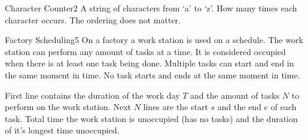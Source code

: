 \begin{task}{Character Counter}{2}
    \In
    A string of characters from `a' to `z'.
    \Out
    How many times each character occurs. The ordering does not matter.

    \begin{ExampleIO}
    \end{ExampleIO}
\end{task}

\begin{task}{Factory Scheduling}{5}
    On a factory a work station is used on a schedule. The work station
    can perform any amount of tasks at a time. It is considered occupied
    when there is at least one task being done. Multiple tasks can start
    and end in the same moment in time. No task starts and ends at the same
    moment in time.
 
    \In
    First line contains the duration of the work day $T$ and the amount of tasks $N$
    to perform on the work station. Next $N$ lines are the start $s$ and the end $e$
    of each task.
    \Out
    Total time the work station is unoccupied (has no tasks) and the duration of
    it's longest time unoccupied. \\

    \begin{ExampleIO}
    \end{ExampleIO}
\end{task}
